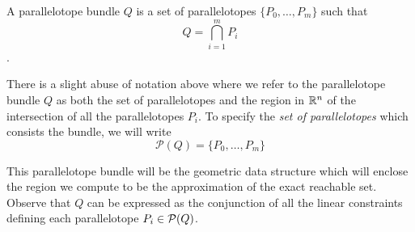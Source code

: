 %
%
\begin{definition}
A parallelotope bundle $Q$ is a set of parallelotopes $\{P_0, \ldots, P_m\}$ such that
  $$ Q = \bigcap_{i=1}^{m}P_i $$.
\end{definition}

\begin{remark}
There is a slight abuse of notation above where we refer to the parallelotope bundle $Q$ as both the set of parallelotopes and the region in ${\mathbb{R}}^n$ of the intersection of all the parallelotopes $P_i$. To specify the \emph{set of parallelotopes} which consists the bundle, we will write
$$
\mathcal{P}(Q) = \{P_0, \ldots, P_m\}
$$
\end{remark}

%
\noindent This parallelotope bundle will be the geometric data structure which will enclose the region we compute to be the approximation of the exact reachable set. Observe that $Q$ can be expressed as the conjunction of all the linear constraints defining each parallelotope $P_i \in \mathcal{P}(Q)$.

